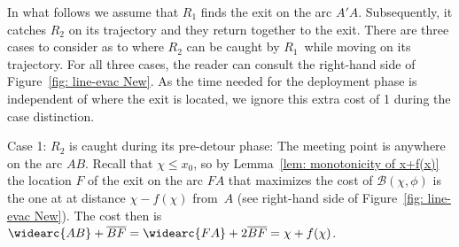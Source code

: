 \documentclass[
final
]{dmtcs-episciences}
\newcommand{\barr}[1]{\overline{#1}}
\newcommand{\RA}{\ensuremath{R_1}}
\newcommand{\RB}{\ensuremath{R_2 }}
\newcommand{\arccc}[1]{
\widearc{#1}
}
\theoremstyle{definition}
\begin{document}
In what follows we assume that $\RA$ finds the exit on the arc $A'A$. Subsequently, it catches $\RB$ on its trajectory and they return together to the exit. 
There are three cases to consider as to where $\RB$ can be caught by \RA\ while moving on its trajectory. 
For all three cases, the reader can consult the right-hand side of Figure~\ref{fig: line-evac New}. As the time needed for the deployment phase is independent of where the exit is located, we ignore this extra cost of 1 during the
case distinction.



\begin{description}
\item{Case 1: $\RB$ is caught during its pre-detour phase:} The meeting point is anywhere on the arc $AB$. Recall that $\chi\leq x_0$, so by Lemma~\ref{lem: monotonicity of x+f(x)} the location $F$ of the exit on the arc $FA$ that maximizes the cost of $\mathcal B(\chi, \phi)$ is the one at at distance $\chi-f(\chi)$ from~$A$ (see right-hand side of Figure~\ref{fig: line-evac New}). The cost then is $\arccc{AB}+\barr{BF}=\arccc{FA}+2\barr{BF} =\chi + f(\chi)$. 


\end{description}
\end{document}
